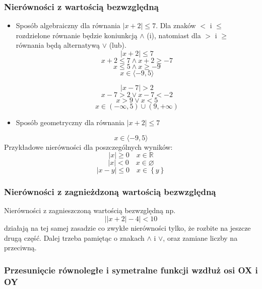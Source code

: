 \documentclass[12pt, a4paper]{article}
\begin{document}
\subsubsection*{Nierówności z wartością bezwzględną}
\begin{itemize}
  \item Sposób algebraiczny dla równania $\left|x + 2\right| \leq 7$. Dla znaków $<$ i $\leq$ rozdzielone równanie będzie
    koniunkcją $\wedge$ (i), natomiast dla $>$ i $\geq$ równania będą alternatywą $\vee$ (lub).
      $$\left| x+2 \right| \leq 7$$
      $$x+2 \leq 7 \wedge x+2\geq -7$$
      $$x \leq 5 \wedge x \geq -9$$
      $$x \in \langle -9,5 \rangle$$

      $$\left| x-7 \right| > 2$$
      $$x-7 > 2 \vee x-7 < -2$$
      $$x > 9 \vee x < 5$$
      $$x \in \left(-\infty, 5\right) \cup \left(9, +\infty \right)$$
  \item Sposób geometryczny dla równania $\left|x + 2\right| \leq 7$
    \begin{center}
    \end{center}
\end{itemize}
$$x \in \langle-9, 5\rangle$$
Przykładowe nierówności dla poszczególnych wyników:
$$\left|x\right|\geq0 \quad x \in \mathbb{R}$$
$$\left|x\right|<0 \quad x \in \varnothing$$
$$\left|x - y\right|\leq0 \quad x \in \left\{y\right\}$$


\subsubsection*{Nierówności z zagnieżdzoną wartością bezwzględną}
Nierówności z zagnieszczoną wartością bezwzględną np. $$\left|\left|x+2\right|-4\right|<10$$ działają na tej samej zasadzie co
zwykłe nierówności tylko, że rozbite na jeszcze drugą część. Dalej trzeba pamiętąc o znakach $\wedge$ i $\vee$, oraz zamiane liczby na przeciwną.

\subsubsection{Przesunięcie równoległe i symetralne funkcji wzdłuż osi OX i OY}
\end{document}
